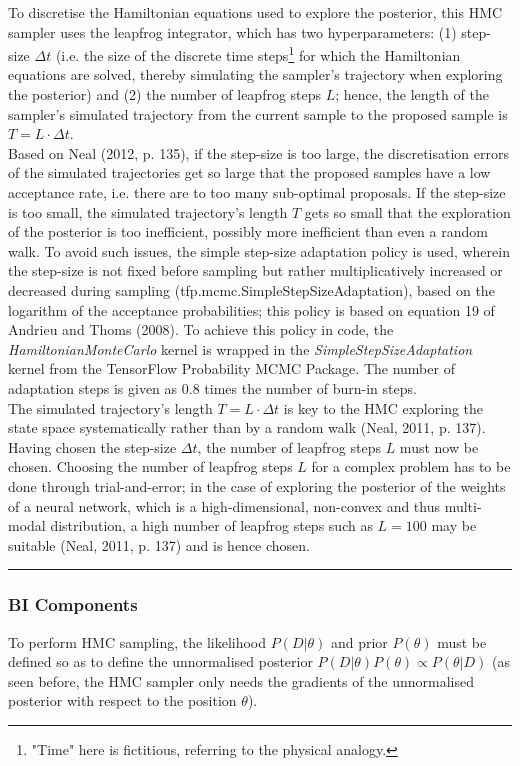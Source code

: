\documentclass[conference]{IEEEtran}
\begin{document}
To discretise the Hamiltonian equations used to explore the posterior, this HMC sampler uses the leapfrog integrator, which has two hyperparameters: (1) step-size $\Delta t$ (i.e. the size of the discrete time steps\footnote{"Time" here is fictitious, referring to the physical analogy.} for which the Hamiltonian equations are solved, thereby simulating the sampler's trajectory when exploring the posterior) and (2) the number of leapfrog steps $L$; hence, the length of the sampler's simulated trajectory from the current sample to the proposed sample is $T = L \cdot \Delta t$.\\

Based on Neal (2012, p. 135), if the step-size is too large, the discretisation errors of the simulated trajectories get so large that the proposed samples have a low acceptance rate, i.e. there are to too many sub-optimal proposals. If the step-size is too small, the simulated trajectory's length $T$ gets so small that the exploration of the posterior is too inefficient, possibly more inefficient than even a random walk. To avoid such issues, the simple step-size adaptation policy is used, wherein the step-size is not fixed before sampling but rather multiplicatively increased or decreased during sampling (tfp.mcmc.SimpleStepSizeAdaptation), based on the logarithm of the acceptance probabilities; this policy is based on equation 19 of Andrieu and Thoms (2008). To achieve this policy in code, the \textit{HamiltonianMonteCarlo} kernel is wrapped in the \textit{SimpleStepSizeAdaptation} kernel from the TensorFlow Probability MCMC Package. The number of adaptation steps is given as 0.8 times the number of burn-in steps.\\

The simulated trajectory's length $T = L \cdot \Delta t$ is key to the HMC exploring the state space systematically rather than by a random walk (Neal, 2011, p. 137). Having chosen the step-size $\Delta t$, the number of leapfrog steps $L$ must now be chosen. Choosing the number of leapfrog steps $L$ for a complex problem has to be done through trial-and-error; in the case of exploring the posterior of the weights of a neural network, which is a high-dimensional, non-convex and thus multi-modal distribution, a high number of leapfrog steps such as $L = 100$ may be suitable (Neal, 2011, p. 137) and is hence chosen.

\par\noindent\rule{0.49\textwidth}{0.1pt}

\subsubsection{BI Components}
To perform HMC sampling, the likelihood $P(D|\theta)$ and prior $P(\theta)$ must be defined so as to define the unnormalised posterior $P(D|\theta)P(\theta) \propto P(\theta|D)$ (as seen before, the HMC sampler only needs the gradients of the unnormalised posterior with respect to the position $\theta$).\\
\end{document}
